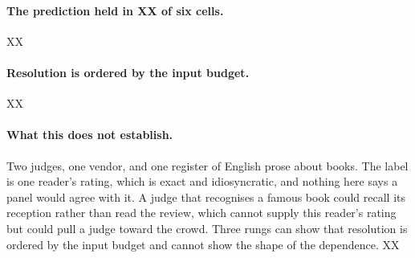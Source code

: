 \paragraph{The prediction held in XX of six cells.}
XX

\paragraph{Resolution is ordered by the input budget.}
XX

\paragraph{What this does not establish.}
Two judges, one vendor, and one register of English prose about books. The label is one reader's rating, which is exact and idiosyncratic, and nothing here says a panel would agree with it. A judge that recognises a famous book could recall its reception rather than read the review, which cannot supply this reader's rating but could pull a judge toward the crowd. Three rungs can show that resolution is ordered by the input budget and cannot show the shape of the dependence. XX
